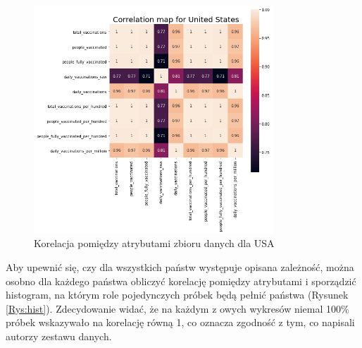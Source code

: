 \documentclass[12pt, oneside]{article}
\begin{document}
\begin{figure}[h]
\centering
\includegraphics[width=0.8\textwidth]{../img/usa_corr.png} 
\caption{Korelacja pomiędzy atrybutami zbioru danych dla USA}
\label{Rys:usa}
\end{figure}

Aby upewnić się, czy dla wszystkich państw występuje opisana zależność, można osobno dla każdego państwa obliczyć korelację pomiędzy atrybutami i sporządzić histogram, na którym role pojedynczych próbek będą pełnić państwa (Rysunek \ref{Rys:hist}). Zdecydowanie widać, że na każdym z owych wykresów niemal 100\% próbek wskazywało na korelację równą 1, co oznacza zgodność z tym, co napisali autorzy zestawu danych.
\end{document}
